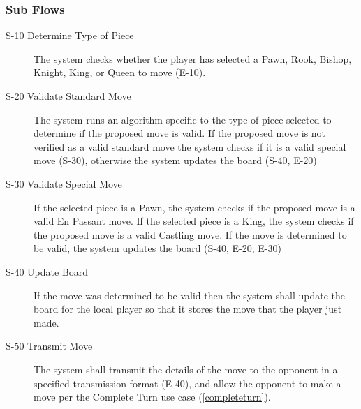\subsubsection{Sub Flows}
\begin{description}
\item[S-10 Determine Type of Piece] The system checks whether the player has selected a Pawn, Rook, Bishop, Knight, King, or Queen to move (E-10).
\item[S-20 Validate Standard Move] The system runs an algorithm specific to the type of piece selected to determine if the proposed move is valid.  If the proposed move is not verified as a valid standard move the system checks if it is a valid special move (S-30), otherwise the system updates the board (S-40, E-20)
\item[S-30 Validate Special Move] If the selected piece is a Pawn, the system checks if the proposed move is a valid En Passant move.  If the selected piece is a King, the system checks if the proposed move is a valid Castling move.  If the move is determined to be valid, the system updates the board (S-40, E-20, E-30)
\item[S-40 Update Board]  If the move was determined to be valid then the system shall update the board for the local player so that it stores the move that the player just made.
\item[S-50 Transmit Move] The system shall transmit the details of the move to the opponent in a specified transmission format (E-40), and allow the opponent to make a move per the Complete Turn use case (\ref{completeturn}).
\end{description}
